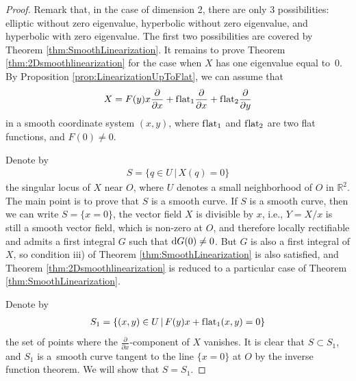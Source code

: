 \documentclass[pdftex]{sigma}
\numberwithin{equation}{section}
\newcommand{\bbR}{\mathbb R}
\begin{document}
\begin{proof}
Remark that, in the case of dimension 2, there are only 3 possibilities: elliptic without zero eigenvalue,
hyperbolic without zero eigenvalue, and hyperbolic with zero eigenvalue. The f\/irst two possibilities
are covered by Theorem \ref{thm:SmoothLinearization}. It remains to prove Theorem \ref{thm:2Dsmoothlinearization}
for the case when $X$ has one eigenvalue equal to~0. By Proposition \ref{prop:LinearizationUpToFlat}, we can assume
that
\begin{gather*}
X = F(y) x \frac{\partial}{\partial x} + \text{f\/lat}_1 \frac{\partial}{\partial x} + \text{f\/lat}_2 \frac{\partial}{\partial y}
\end{gather*}
in a smooth coordinate system $(x,y)$, where $\text{f\/lat}_1$ and $\text{f\/lat}_2$ are two f\/lat functions, and $F(0) \neq 0$.

 Denote by
\begin{gather*}
 S = \{ q \in U \, | \, X(q) = 0\}
\end{gather*}
the singular locus of $X$ near $O$, where $U$ denotes a small neighborhood of $O$ in $\bbR^2$. The main point is to prove
that $S$ is a smooth curve. If $S$ is a smooth curve, then we can write $S = \{x=0\}$, the vector f\/ield $X$ is divisible by $x$,
i.e., $Y = X/x$ is still a smooth vector f\/ield, which is non-zero at $O$, and therefore locally rectif\/iable and admits a
f\/irst integral $G$ such that ${\rm d}G(0) \neq 0$. But $G$ is also a f\/irst integral of $X$, so condition iii) of Theorem \ref{thm:SmoothLinearization}
is also satisf\/ied, and Theorem \ref{thm:2Dsmoothlinearization} is reduced to a particular case of Theorem \ref{thm:SmoothLinearization}.

Denote by
\begin{gather*}
 S_1 = \{(x,y) \in U \, | \, F(y)x + \text{f\/lat}_1 (x,y) = 0 \}
\end{gather*}
the set of points where the $\frac{\partial}{\partial x}$-component of $X$ vanishes. It is clear that $S \subset S_1$, and $S_1$ is a~smooth curve
tangent to the line $\{ x= 0 \}$ at $O$ by the inverse function theorem. We will show that $S = S_1$.


\end{proof}
\end{document}
